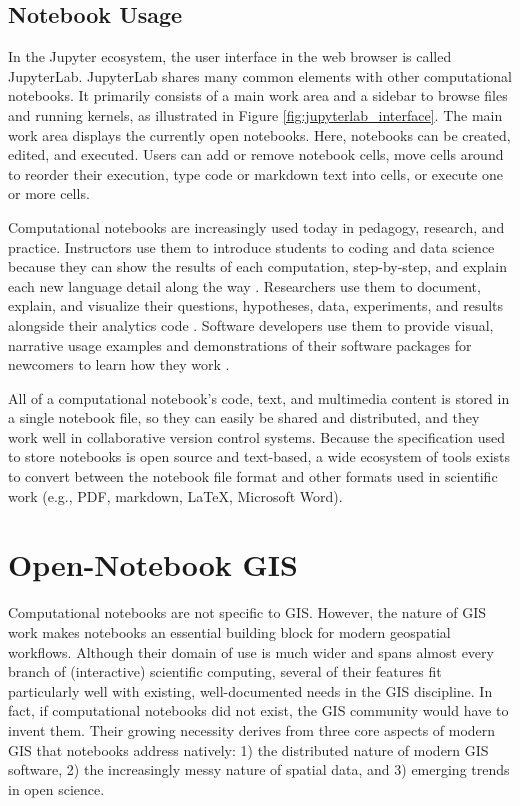 \documentclass[11pt,letterpaper]{article}
\begin{document}
\subsection{Notebook Usage}

In the Jupyter ecosystem, the user interface in the web browser is called JupyterLab. JupyterLab shares many common elements with other computational notebooks. It primarily consists of a main work area and a sidebar to browse files and running kernels, as illustrated in Figure \ref{fig:jupyterlab_interface}. The main work area displays the currently open notebooks. Here, notebooks can be created, edited, and executed. Users can add or remove notebook cells, move cells around to reorder their execution, type code or markdown text into cells, or execute one or more cells.

Computational notebooks are increasingly used today in pedagogy, research, and practice. Instructors use them to introduce students to coding and data science because they can show the results of each computation, step-by-step, and explain each new language detail along the way \citep{reades_teaching_2020}. Researchers use them to document, explain, and visualize their questions, hypotheses, data, experiments, and results alongside their analytics code \citep{perkel_why_2018}. Software developers use them to provide visual, narrative usage examples and demonstrations of their software packages for newcomers to learn how they work \citep{boeing_urban_2020}.

All of a computational notebook's code, text, and multimedia content is stored in a single notebook file, so they can easily be shared and distributed, and they work well in collaborative version control systems. Because the specification used to store notebooks is open source and text-based, a wide ecosystem of tools exists to convert between the notebook file format and other formats used in scientific work (e.g., PDF, markdown, LaTeX, Microsoft Word).

\section{Open-Notebook GIS}

Computational notebooks are not specific to GIS. However, the nature of GIS work makes notebooks an essential building block for modern geospatial workflows. Although their domain of use is much wider and spans almost every branch of (interactive) scientific computing, several of their features fit particularly well with existing, well-documented needs in the GIS discipline. In fact, if computational notebooks did not exist, the GIS community would have to invent them. Their growing necessity derives from three core aspects of modern GIS that notebooks address natively: 1) the distributed nature of modern GIS software, 2) the increasingly messy nature of spatial data, and 3) emerging trends in open science.
\end{document}
